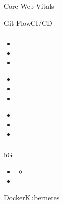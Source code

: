 
\important{}\important{}Core Web Vitals

\important{}\important{}


\important{}Git FlowCI/CD

\hypertarget{section-94}{%
\subsubsection{}\label{section-94}}

\important{}

\begin{itemize}
\item
  \important{}
\item
  \important{}
\item
  \important{}
\end{itemize}

\important{}

\begin{itemize}
\item
  \important{}
\item
  \important{}
\item
  \important{}
\end{itemize}

\important{}

\begin{itemize}
\item
\item
  \important{}
\item
  \important{}
\end{itemize}

\hypertarget{section-95}{%
\subsubsection{}\label{section-95}}

\important{}

5G

\begin{itemize}
\item
  \begin{itemize}
  \tightlist
  \item
  \end{itemize}
\item
  \important{}
\end{itemize}

DockerKubernetes

